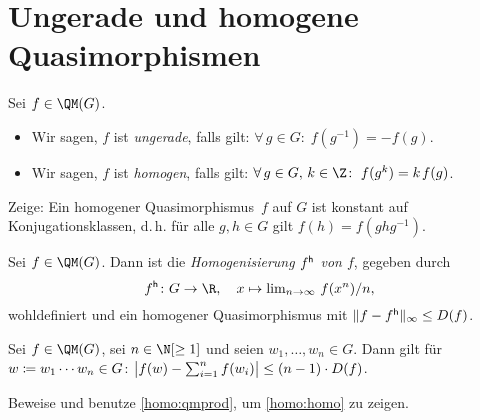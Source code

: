 \section{Ungerade und homogene Quasimorphismen}
\begin{thDef}
    Sei $f\in\QM(G)$.
    \begin{itemize}
        \item
            Wir sagen, $f$ ist \emph{ungerade}, falls gilt:
            $\forall\,g\in G\colon\; f(g^{-1}) = -f(g)$.
            
        \item
            Wir sagen, $f$ ist \emph{homogen}, falls gilt:
            $\forall\,g\in G,\,k\in\Z\colon\;
                f(g^k) = k \mkern2mu f(g)$.
    \end{itemize}
\end{thDef}

\begin{thAufgabe}
    Zeige: Ein homogener Quasimorphismus~$f$ auf $G$ ist konstant auf
    Konjugationsklassen, d.\,h. für alle $g,h\in G$ gilt $f(h) = f(ghg^{-1})$.
\end{thAufgabe}

\begin{thProposition}[Homogenisierung]
    \label{homo:homo}%
    Sei $f\in\QM(G)$. Dann ist die \emph{Homogenisierung $f\homo$ von $f$},
    gegeben durch
    \[ f\homo \colon G \to \R, \quad
        x\mapsto \lim\nolimits_{n\to\infty}\, f(x^n)/n
    , \]
    wohldefiniert und ein homogener Quasimorphismus mit
    $\norm{f-f\homo}_\supr \leq D(f)$.
\end{thProposition}

\begin{thLemma} \label{homo:qmprod}
    Sei $f\in\QM(G)$, sei $n\in\N[\geq1]$ und seien
    $w_1,\dots,w_n\in G$. Dann gilt für $w\defeq w_1\cdots w_n\in G$:
    \quad
    $\abs[\big]{ f(w) - \sum\nolimits_{i=1}^n f(w_i) } \leq (n-1)\cdot D(f)$.
\end{thLemma}

\begin{thAufgabe}
    Beweise und benutze \cref{homo:qmprod}, um \cref{homo:homo} zu zeigen.
\end{thAufgabe}
